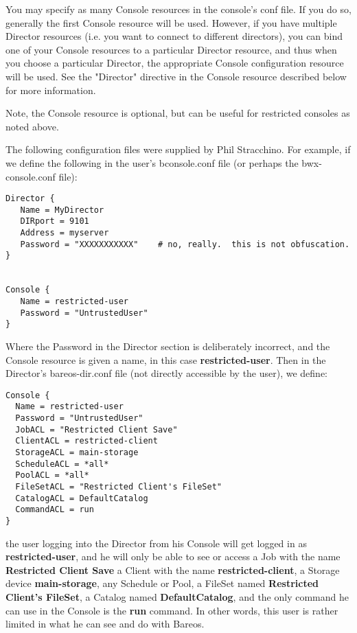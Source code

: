 You may specify as many Console resources in the console's conf file. If
you do so, generally the first Console resource will be used.  However, if
you have multiple Director resources (i.e. you want to connect to different
directors), you can bind one of your Console resources to a particular
Director resource, and thus when you choose a particular Director, the
appropriate Console configuration resource will be used. See the "Director"
directive in the Console resource described below for more information.

Note, the Console resource is optional, but can be useful for
restricted consoles as noted above.





The following configuration files were supplied by Phil Stracchino. For
example, if we define the following in the user's bconsole.conf file (or
perhaps the bwx-console.conf file):

\footnotesize
\begin{verbatim}
Director {
   Name = MyDirector
   DIRport = 9101
   Address = myserver
   Password = "XXXXXXXXXXX"    # no, really.  this is not obfuscation.
}


Console {
   Name = restricted-user
   Password = "UntrustedUser"
}
\end{verbatim}
\normalsize

Where the Password in the Director section is deliberately incorrect, and the
Console resource is given a name, in this case {\bf restricted-user}. Then
in the Director's bareos-dir.conf file (not directly accessible by the user),
we define:

\footnotesize
\begin{verbatim}
Console {
  Name = restricted-user
  Password = "UntrustedUser"
  JobACL = "Restricted Client Save"
  ClientACL = restricted-client
  StorageACL = main-storage
  ScheduleACL = *all*
  PoolACL = *all*
  FileSetACL = "Restricted Client's FileSet"
  CatalogACL = DefaultCatalog
  CommandACL = run
}
\end{verbatim}
\normalsize

the user logging into the Director from his Console will get logged in as {\bf
restricted-user}, and he will only be able to see or access a Job with the
name {\bf Restricted Client Save} a Client with the name {\bf
restricted-client}, a Storage device {\bf main-storage}, any Schedule or Pool,
a FileSet named {\bf Restricted Client's FileSet}, a Catalog named {\bf
DefaultCatalog}, and the only command he can use in the Console is the {\bf
run} command. In other words, this user is rather limited in what he can see
and do with Bareos.

